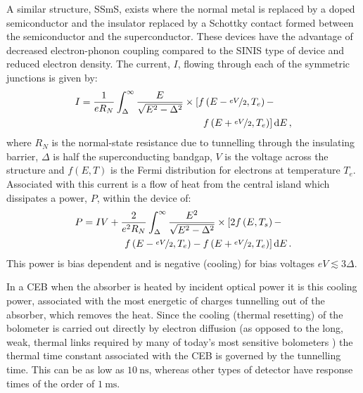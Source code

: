 \documentclass[aip, apl, a4paper, amsmath,amssymb, reprint]{revtex4-1}
\begin{document}
A similar structure, SSmS, exists where the normal metal is replaced by a doped semiconductor and the insulator replaced by a Schottky contact formed between the semiconductor and the superconductor\cite{Savin01}. These devices have the advantage of decreased electron-phonon coupling compared to the SINIS type of device\cite{Prest11} and reduced electron density. The current, $I$, flowing through each of the symmetric junctions is given by:
\begin{align}
I &=\frac{1}{eR_{N}}\int_{\Delta}^{\infty} \frac{E}{\sqrt{E^{2}-\Delta^{2}}}  \times \left[f\left(E-\nicefrac{eV}{2},T_{e}\right) - \right. \nonumber \\
&\qquad \qquad \qquad \qquad \qquad \qquad  \; \left. f\left(E+\nicefrac{eV}{2},T_{e}\right)\right] \mathrm{d}E\, , \label{eq:IV}
\end{align}
where $R_{N}$ is the normal-state resistance due to tunnelling through the insulating barrier, $\Delta$ is half the superconducting bandgap, $V$ is the  voltage across the structure and  $f\left(E,T\right)$ is the Fermi distribution for electrons at temperature $T_{e}$. Associated with this current is a flow of heat from the central island which dissipates a power, $P$, within the device of:
\begin{align}
P &= IV + \frac{2}{e^{2}R_{N}}\int_{\Delta}^{\infty} \frac{E^{2}}{\sqrt{E^{2}-\Delta^{2}}} \times \left[2f\left(E,T_{s}\right) - \right. \nonumber \\ 
&\qquad \qquad  \left. f\left(E-\nicefrac{eV}{2},T_{e}\right)- f\left(E+\nicefrac{eV}{2}, T_{e}\right)\right] \mathrm{d}E\, \label{eqn:Pc}.
\end{align}
This power is bias dependent and is negative (cooling) for bias voltages $eV \lesssim 3\Delta$.

In a CEB when the absorber is heated by incident optical power it is this cooling power, associated with the most energetic of charges tunnelling out of the absorber, which removes the heat. Since the cooling (thermal resetting) of the bolometer is carried out directly by electron diffusion (as opposed to the long, weak, thermal links required by many of today's most sensitive bolometers \cite{Mauskopf97, Audley12, Holland13}) the thermal time constant associated with the CEB is governed by the tunnelling time. This can be \cite{Kuzmin04} as low as $10~\mathrm{ns}$, whereas other types of detector \cite{Jackson12} have response times of the order of $1~\mathrm{ms}$.
\end{document}
